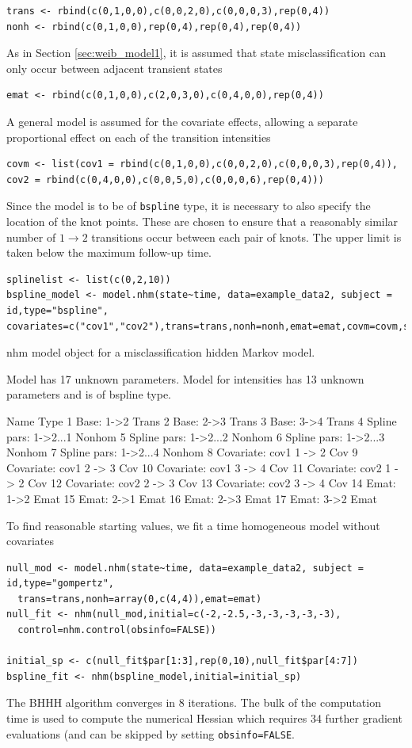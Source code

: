 \documentclass{article}
\numberwithin{equation}{section}
\begin{document}
\begin{verbatim}
trans <- rbind(c(0,1,0,0),c(0,0,2,0),c(0,0,0,3),rep(0,4))
nonh <- rbind(c(0,1,0,0),rep(0,4),rep(0,4),rep(0,4))
\end{verbatim}
As in Section \ref{sec:weib_model1}, it is assumed that state misclassification can only occur between adjacent transient states
\begin{verbatim}
emat <- rbind(c(0,1,0,0),c(2,0,3,0),c(0,4,0,0),rep(0,4))
\end{verbatim}
A general model is assumed for the covariate effects, allowing a separate proportional effect on each of the transition intensities
\begin{verbatim}
covm <- list(cov1 = rbind(c(0,1,0,0),c(0,0,2,0),c(0,0,0,3),rep(0,4)),
cov2 = rbind(c(0,4,0,0),c(0,0,5,0),c(0,0,0,6),rep(0,4)))
\end{verbatim}
Since the model is to be of \verb!bspline! type, it is necessary to also specify the location of the knot points. These are chosen to ensure that a reasonably similar number of $1 \rightarrow 2$ transitions occur between each pair of knots. The upper limit is taken below the maximum follow-up time.
\begin{verbatim}
splinelist <- list(c(0,2,10))
bspline_model <- model.nhm(state~time, data=example_data2, subject = id,type="bspline",
covariates=c("cov1","cov2"),trans=trans,nonh=nonh,emat=emat,covm=covm,splinelist=splinelist)
\end{verbatim}
\begin{verbout}
nhm model object for a misclassification hidden Markov model.

Model has 17 unknown parameters.
Model for intensities has 13 unknown parameters and is of bspline type.

                     Name   Type
1              Base: 1->2  Trans
2              Base: 2->3  Trans
3              Base: 3->4  Trans
4   Spline pars: 1->2...1 Nonhom
5   Spline pars: 1->2...2 Nonhom
6   Spline pars: 1->2...3 Nonhom
7   Spline pars: 1->2...4 Nonhom
8  Covariate: cov1 1 -> 2    Cov
9  Covariate: cov1 2 -> 3    Cov
10 Covariate: cov1 3 -> 4    Cov
11 Covariate: cov2 1 -> 2    Cov
12 Covariate: cov2 2 -> 3    Cov
13 Covariate: cov2 3 -> 4    Cov
14             Emat: 1->2   Emat
15             Emat: 2->1   Emat
16             Emat: 2->3   Emat
17             Emat: 3->2   Emat
\end{verbout}

To find reasonable starting values, we fit a time homogeneous model without covariates
\begin{verbatim}
null_mod <- model.nhm(state~time, data=example_data2, subject = id,type="gompertz",
  trans=trans,nonh=array(0,c(4,4)),emat=emat)
null_fit <- nhm(null_mod,initial=c(-2,-2.5,-3,-3,-3,-3,-3),
  control=nhm.control(obsinfo=FALSE))

initial_sp <- c(null_fit$par[1:3],rep(0,10),null_fit$par[4:7])
bspline_fit <- nhm(bspline_model,initial=initial_sp)
\end{verbatim}
The BHHH algorithm converges in 8 iterations. The bulk of the computation time is used to compute the numerical Hessian which requires 34 further gradient evaluations (and can be skipped by setting \verb!obsinfo=FALSE!.
\end{document}
